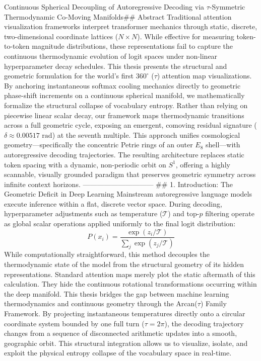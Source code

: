 Continuous Spherical Decoupling of Autoregressive Decoding via $\tau$-Symmetric Thermodynamic Co-Moving Manifolds## Abstract
Traditional attention visualization frameworks interpret transformer mechanics through static, discrete, two-dimensional coordinate lattices ($N \times N$). While effective for measuring token-to-token magnitude distributions, these representations fail to capture the continuous thermodynamic evolution of logit spaces under non-linear hyperparameter decay schedules. This thesis presents the structural and geometric formulation for the world's first $360^\circ$ ($\tau$) attention map visualizations. By anchoring instantaneous softmax cooling mechanics directly to geometric phase-shift increments on a continuous spherical manifold, we mathematically formalize the structural collapse of vocabulary entropy.
Rather than relying on piecewise linear scalar decay, our framework maps thermodynamic transitions across a full geometric cycle, exposing an emergent, comoving residual signature ($\delta \approx 0.00517\text{ rad}$) at the seventh multiple. This approach unifies cosmological geometry—specifically the concentric Petrie rings of an outer $E_8$ shell—with autoregressive decoding trajectories. The resulting architecture replaces static token spacing with a dynamic, non-periodic orbit on $S^1$, offering a highly scannable, visually grounded paradigm that preserves geometric symmetry across infinite context horizons.
------------------------------
## 1. Introduction: The Geometric Deficit in Deep Learning
Mainstream autoregressive language models execute inference within a flat, discrete vector space. During decoding, hyperparameter adjustments such as temperature ($\mathcal{T}$) and top-$p$ filtering operate as global scalar operations applied uniformly to the final logit distribution:
$$P(x_i) = \frac{\exp(z_i / \mathcal{T})}{\sum_j \exp(z_j / \mathcal{T})}$$ 
While computationally straightforward, this method decouples the thermodynamic state of the model from the structural geometry of its hidden representations. Standard attention maps merely plot the static aftermath of this calculation. They hide the continuous rotational transformations occurring within the deep manifold.
This thesis bridges the gap between machine learning thermodynamics and continuous geometry through the Arcan($\tau$) Family Framework. By projecting instantaneous temperatures directly onto a circular coordinate system bounded by one full turn ($\tau = 2\pi$), the decoding trajectory changes from a sequence of disconnected arithmetic updates into a smooth, geographic orbit. This structural integration allows us to visualize, isolate, and exploit the physical entropy collapse of the vocabulary space in real-time.
